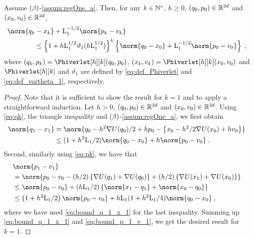   \begin{lemma}
    \label{lem:bound_first_iterate_leapfrog_a}
  Assume $(\beta)$-\ref{assum:regOne_a}. Then, for any $k \in \mathbb{N}^{*}$, $h \geq 0$, $(q_0,p_0) \in \mathbb{R}^{2d}$ and $(x_0,v_0) \in \mathbb{R}^{2d}$,
  \begin{align}
   & \norm{q_k-x_k} + \constzero^{-1/2} \norm{p_k-v_k} \\
    & \qquad \qquad \leq \defEns{1+h \constzero^{1/2} \vartheta_1(h \constzero^{1/2})}^{k} \defEns{\norm{q_0-x_0} + \constzero^{-1/2} \norm{p_0-v_0}} \eqsp,
  \end{align}
  where $(q_k,p_k)= \Phiverlet[h][k](q_0,p_0)$, $(x_k,v_k)= \Phiverlet[h][k](x_0,v_0)$ and  $\Phiverlet[h][k]$ and $\vartheta_1$ are defined by \eqref{eq:def_Phiverlet} and \eqref{eq:def_vartheta_1}, respectively.
\end{lemma}
\begin{proof}
  Note that it is sufficient to show the result for $k=1$ and to apply a straightforward induction.
  Let $h >0$, $(q_0,p_0) \in \mathbb{R}^{2d}$ and $(x_0,v_0) \in \mathbb{R}^{2d}$. Using \eqref{eq:qk}, the triangle inequality and   $(\beta)$-\ref{assum:regOne_a}, we first obtain
  \begin{align}
    \nonumber
    \norm{q_1-x_1} & = \norm{q_0 -h^2 \nabla U(q_0) /2 + h p_0 - \defEns{x_0 - h^2/2 \nabla U(x_0) + h v_0}} \\
    \label{eq:bound_q_1_x_1}
         & \leq (1+ h^2 \constzero /2) \norm{q_0 - x_0} + h \norm{p_0 - v_0} \eqsp.
  \end{align}
  Second, similarly using \eqref{eq:pk}, we have that
\begin{align}
\label{eq:bound_p_1_v_1}
&    \norm{p_1-v_1}  \\
&= \norm{p_0-v_0 -(h/2) \defEns{\nabla U(q_1) + \nabla U(q_0)} + (h/2) \defEns{\nabla U(x_1) + \nabla U(x_0)}} \\
\nonumber
&\leq \norm{p_0 - v_0} + (h \constzero/2) \defEns{ \norm{x_1- q_1} + \norm{x_0 - q_0}} \\
\nonumber
& \leq \left(1+h^2 \constzero/2\right) \norm{p_0-v_0} +h\constzero(1+h^2\constzero /4) \norm{q_0-x_0} \eqsp,
\end{align}
  where we have used \eqref{eq:bound_q_1_x_1} for the last inequality. Summing up \eqref{eq:bound_q_1_x_1} and \eqref{eq:bound_p_1_v_1}, we get the desired result for $k=1$.
  \end{proof}
